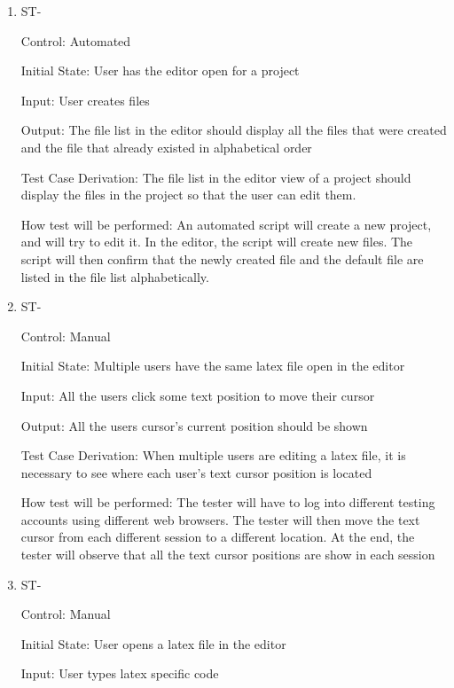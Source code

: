 \documentclass[12pt, titlepage]{article}
\newcounter{TESTID}
\newcommand\TESTNUM{\stepcounter{TESTID}\theTESTID}
\begin{document}
	\begin{enumerate}
		
		\item{ST-\TESTNUM\\}
		
		Control: Automated
		
		Initial State: User has the editor open for a project
		
		Input: User creates files
		
		Output: The file list in the editor should display all the files that were created and the file that already existed in alphabetical order
		
		Test Case Derivation: The file list in the editor view of a project should display the files in the project so that the user can edit them.
		
		How test will be performed: An automated script will create a new project, and will try to edit it. In the editor, the script will create new files. The script will then confirm that the newly created file and the default file are listed in the file list alphabetically.
		
		\item{ST-\TESTNUM\\}
		
		Control: Manual
		
		Initial State: Multiple users have the same latex file open in the editor
		
		Input: All the users click some text position to move their cursor
		
		Output: All the users cursor's current position should be shown
		
		Test Case Derivation: When multiple users are editing a latex file, it is necessary to see where each user's text cursor position is located
		
		How test will be performed: The tester will have to log into different testing accounts using different web browsers. The tester will then move the text cursor from each different session to a different location. At the end, the tester will observe that all the text cursor positions are show in each session
		
		\item{ST-\TESTNUM\\}
		
		Control: Manual
		
		Initial State: User opens a latex file in the editor
		
		Input: User types latex specific code
		

\end{enumerate}
\end{document}
